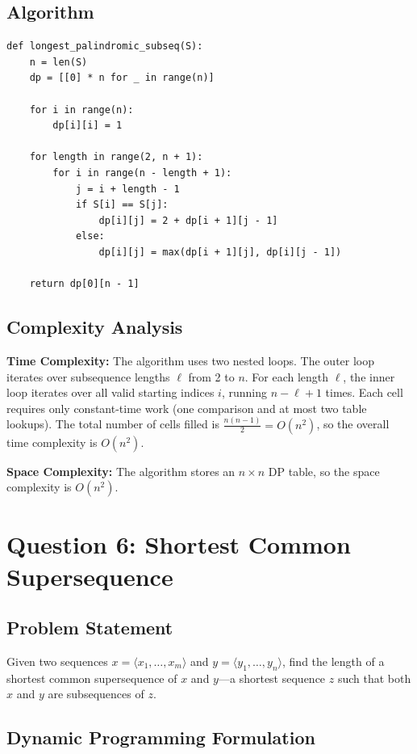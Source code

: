 \documentclass[12pt,a4paper]{article}
\begin{document}
\subsection*{Algorithm}

\begin{verbatim}
def longest_palindromic_subseq(S):
    n = len(S)
    dp = [[0] * n for _ in range(n)]

    for i in range(n):
        dp[i][i] = 1

    for length in range(2, n + 1):
        for i in range(n - length + 1):
            j = i + length - 1
            if S[i] == S[j]:
                dp[i][j] = 2 + dp[i + 1][j - 1]
            else:
                dp[i][j] = max(dp[i + 1][j], dp[i][j - 1])

    return dp[0][n - 1]
\end{verbatim}

\subsection*{Complexity Analysis}

\textbf{Time Complexity:} The algorithm uses two nested loops. The outer loop iterates over subsequence lengths $\ell$ from 2 to $n$. For each length $\ell$, the inner loop iterates over all valid starting indices $i$, running $n - \ell + 1$ times. Each cell requires only constant-time work (one comparison and at most two table lookups). The total number of cells filled is $\frac{n(n-1)}{2} = O(n^2)$, so the overall time complexity is $O(n^2)$.

\textbf{Space Complexity:} The algorithm stores an $n \times n$ DP table, so the space complexity is $O(n^2)$.

\newpage

\section*{Question 6: Shortest Common Supersequence}

\subsection*{Problem Statement}
Given two sequences $x = \langle x_1, \ldots, x_m \rangle$ and $y = \langle y_1, \ldots, y_n \rangle$, find the length of a shortest common supersequence of $x$ and $y$---a shortest sequence $z$ such that both $x$ and $y$ are subsequences of $z$.

\subsection*{Dynamic Programming Formulation}
\end{document}
